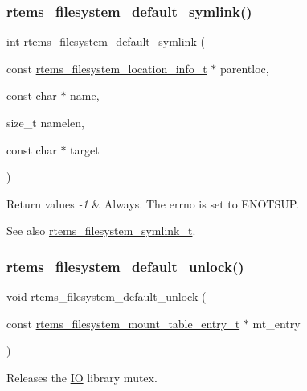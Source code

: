 \subsubsection{\texorpdfstring{rtems\_filesystem\_default\_symlink()}{rtems\_filesystem\_default\_symlink()}}
{\footnotesize\ttfamily int rtems\+\_\+filesystem\+\_\+default\+\_\+symlink (\begin{DoxyParamCaption}\item[{const \mbox{\hyperlink{group__LibIO_ga3252b3d31ee3c49ffff0b7604a676864}{rtems\+\_\+filesystem\+\_\+location\+\_\+info\+\_\+t}} $\ast$}]{parentloc,  }\item[{const char $\ast$}]{name,  }\item[{size\+\_\+t}]{namelen,  }\item[{const char $\ast$}]{target }\end{DoxyParamCaption})}


\begin{DoxyRetVals}{Return values}
{\em -\/1} & Always. The errno is set to E\+N\+O\+T\+S\+UP.\\
\hline
\end{DoxyRetVals}
\begin{DoxySeeAlso}{See also}
\mbox{\hyperlink{group__LibIOFSOps_gaf21fe2af848bab4061fd62dd0f60522f}{rtems\+\_\+filesystem\+\_\+symlink\+\_\+t}}. 
\end{DoxySeeAlso}
\mbox{\label{group__LibIOFSOps_ga574786e949fa2835878995fe9c16db6c}} 
\subsubsection{\texorpdfstring{rtems\_filesystem\_default\_unlock()}{rtems\_filesystem\_default\_unlock()}}
{\footnotesize\ttfamily void rtems\+\_\+filesystem\+\_\+default\+\_\+unlock (\begin{DoxyParamCaption}\item[{const \mbox{\hyperlink{structrtems__filesystem__mount__table__entry__tt}{rtems\+\_\+filesystem\+\_\+mount\+\_\+table\+\_\+entry\+\_\+t}} $\ast$}]{mt\+\_\+entry }\end{DoxyParamCaption})}



Releases the \mbox{\hyperlink{structIO}{IO}} library mutex. 

